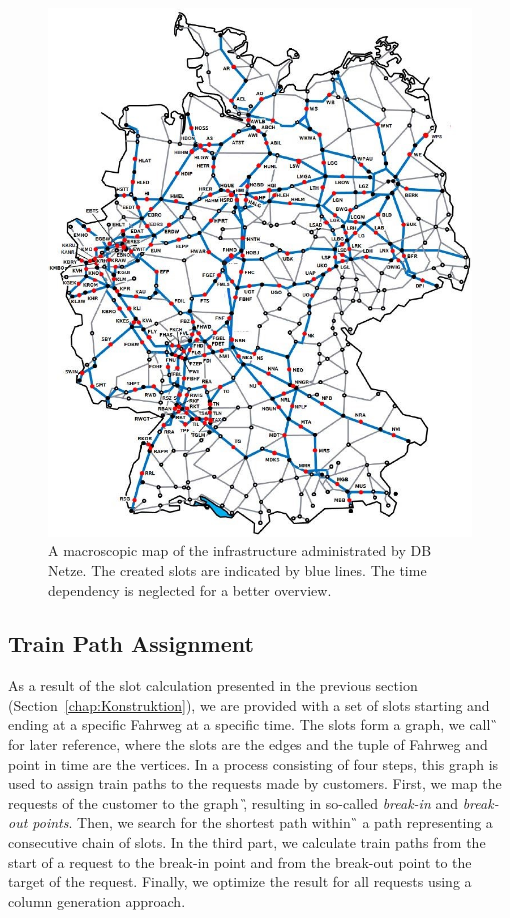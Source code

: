 %
\begin{figure}[tb]
	\centering
	\includegraphics[scale=0.40]{Bilder/STA-Karte.jpg}
	\caption{A macroscopic map of the infrastructure administrated by DB Netze. The created slots are indicated by blue lines. The time dependency is neglected for a better overview.}
	\label{fig:STAKarte}
\end{figure}


\subsection{Train Path Assignment}
\label{chap:Belegung}
%
As a result of the slot calculation presented in the previous section (Section~\ref{chap:Konstruktion}), we are provided with a set of slots starting and ending at a specific Fahrweg at a specific time. The slots form a graph, we call \G\, for later reference, where the slots are the edges and the tuple of Fahrweg and point in time are the vertices. In a process consisting of four steps, this graph is used to assign train paths to the requests made by customers. First, we map the requests of the customer to the graph \G, resulting in so-called \emph{break-in} and \emph{break-out points}. Then, we search for the shortest path within \G\, a path representing a consecutive chain of slots. In the third part, we calculate train paths from the start of a request to the break-in point and from the break-out point to the target of the request. Finally, we optimize the result for all requests using a column generation approach.

